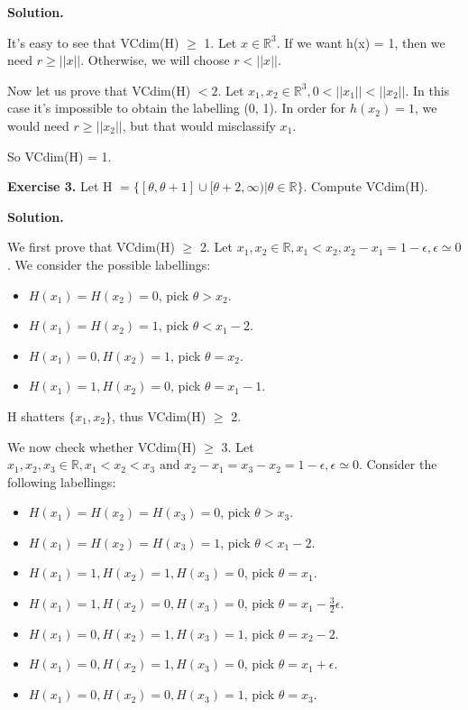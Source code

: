 \documentclass{article}
\newcommand{\<}{\langle}
\renewcommand{\>}{\rangle}
\theoremstyle{definition}
\begin{document}
\textbf{Solution.}

It's easy to see that VCdim(H) $\geq$ 1. Let $x \in \mathbb{R}^3$. If we want h(x) = 1, then we need $r \geq ||x||$. Otherwise, we will choose $r < ||x||$.

Now let us prove that VCdim(H) $< 2$. Let $x_1, x_2 \in \mathbb{R}^3, 0<||x_1||<||x_2||$. In this case it's impossible to obtain the labelling (0, 1). In order for $h(x_2) = 1$, we would need $r \geq ||x_2||$, but that would misclassify $x_1$.

So VCdim(H) = 1.

\vspace{3mm}

\textbf{Exercise 3.} Let H $= \{ [\theta, \theta +1] \cup [\theta+2, \infty)|\theta \in \mathbb{R}\}$. Compute VCdim(H).

\textbf{Solution.}

We first prove that VCdim(H) $\geq$ 2. Let $x_1, x_2 \in \mathbb{R}, x_1 < x_2, x_2 - x_1 = 1 - \epsilon, \epsilon \simeq 0$. We consider the possible labellings:

\begin{itemize}
    \item[] $H(x_1) = H(x_2) = 0$, pick $\theta > x_2$.
    \item[] $H(x_1) = H(x_2) = 1$, pick $\theta < x_1 - 2$.
    \item[] $H(x_1) = 0, H(x_2) = 1$, pick $\theta = x_2$.
    \item[] $H(x_1) = 1, H(x_2) = 0$, pick $\theta = x_1 - 1$.
\end{itemize}{}

H shatters $\{x_1, x_2\}$, thus VCdim(H) $\geq$ 2.

We now check whether VCdim(H) $\geq$ 3. Let $x_1, x_2, x_3 \in \mathbb{R}, x_1 < x_2 < x_3 \text{ and } x_2 - x_1 = x_3 - x_2 = 1 - \epsilon, \epsilon \simeq 0$. Consider the following labellings:

\begin{itemize}
    \item[] $H(x_1) = H(x_2) = H(x_3) = 0$, pick $\theta > x_3$.
    \item[] $H(x_1) = H(x_2) = H(x_3) = 1$, pick $\theta < x_1 - 2$.
    \item[] $H(x_1) = 1, H(x_2) = 1, H(x_3) = 0$, pick $\theta = x_1$.
    \item[] $H(x_1) = 1, H(x_2) = 0, H(x_3) = 0$, pick $\theta = x_1 - \frac{3}{2} \epsilon$.
    \item[] $H(x_1) = 0, H(x_2) = 1, H(x_3) = 1$, pick $\theta = x_2 - 2$.
    \item[] $H(x_1) = 0, H(x_2) = 1, H(x_3) = 0$, pick $\theta = x_1 + \epsilon$.
    \item[] $H(x_1) = 0, H(x_2) = 0, H(x_3) = 1$, pick $\theta = x_3$.
\end{itemize}{}
\end{document}
